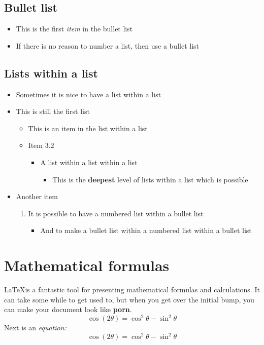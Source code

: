 \subsection{Bullet list}
\begin{itemize}
	\item This is the first \textit{item} in the bullet list
	\item If there is no reason to number a list, then use a bullet list
\end{itemize}

\subsection{Lists within a list}
\begin{itemize}
	\item Sometimes it is nice to have a list within a list
	\item This is still the first list
	\begin{itemize}
		\item This is an item in the list within a list
		\item Item 3.2
		\begin{itemize}
			\item A list within a list within a list
			\begin{itemize}
				\item This is the \textbf{deepest} level of lists within a list which is possible
			\end{itemize}
		\end{itemize}
	\end{itemize}
	\item Another item
	\begin{enumerate}
		\item It is possible to have a numbered list within a bullet list
		\begin{itemize}
			\item And to make a bullet list within a numbered list within a bullet list
		\end{itemize}
	\end{enumerate}
\end{itemize}

\section{Mathematical formulas}
\LaTeX \space is a fantastic tool for presenting mathematical formulas and calculations. It can take some while to get used to, but when you get over the initial bump, you can make your document look like \textbf{porn}.\cite{adams1995hitchhiker}
$$\cos (2\theta) = \cos^2 \theta - \sin^2 \theta$$
Next is an \textit{equation:}
\begin{equation}
\cos (2\theta) = \cos^2 \theta - \sin^2 \theta
\end{equation}

